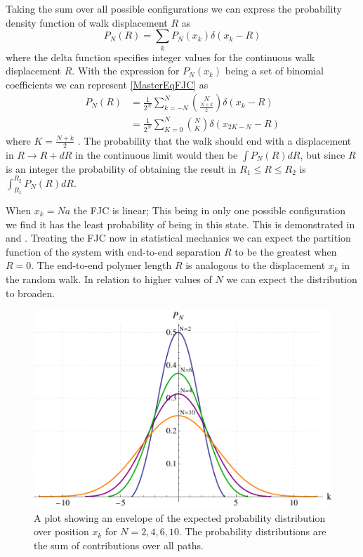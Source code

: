 Taking the sum over all possible configurations we can express the probability density function of walk displacement $R$ as
%
\begin{equation}\label{MasterEqFJC}
P_{N}\left(R\right)=\sum_{k}P_{N}\left(x_{k}\right)\delta\left(x_{k}-R\right)
\end{equation}
%
where the delta function specifies integer values for the continuous walk displacement $R$. With the expression for $P_{N}\left(x_{k}\right)$ being a set of binomial coefficients we can represent \eqref{MasterEqFJC} as
%
\begin{align}
P_{N}\left(R\right)&=\frac{1}{2^{N}}\sum_{k=-N}^{N}\binom{N}{\frac{N+k}{2}}\delta\left(x_{k}-R\right)\\
&=\frac{1}{2^{N}}\sum_{K=0}^{N}\binom{N}{K}\delta\left(x_{2K-N}-R\right)\label{pdist}
\end{align}
%
where $K=\frac{N+k}{2}$ \cite{Reif1965}. The probability that the walk should end with a displacement in $R\rightarrow R+dR$ in the continuous limit would then be $\int P_{N}\left(R\right)dR$, but since $R$ is an integer the probability of obtaining the result in $R_{1} \leq R \leq R_{2}$ is $\int^{R_{2}}_{R_{1}} P_{N}\left(R\right)dR$.

When $x_{k}=Na$ the FJC is linear; This being in only one possible configuration we find it has the least probability of being in this state. This is demonstrated in  and . Treating the FJC now in statistical mechanics we can expect the partition function of the system with end-to-end separation $R$ to be the greatest when $R=0$. The end-to-end polymer length $R$ is analogous to the displacement $x_{k}$ in the random walk. In relation to higher values of $N$ we can expect the distribution to broaden.

\begin{figure}[H]
\centering \includegraphics[scale=0.6]{Graphics/ExpectedProbabilityDistribution.pdf}
\caption{A plot showing an envelope of the expected probability distribution over position $x_{k}$
for $N=2,4,6,10$. The probability distributions are the sum of contributions over
all paths.}
\label{fig:ProbabilityDistributionN24610} 
\end{figure}

